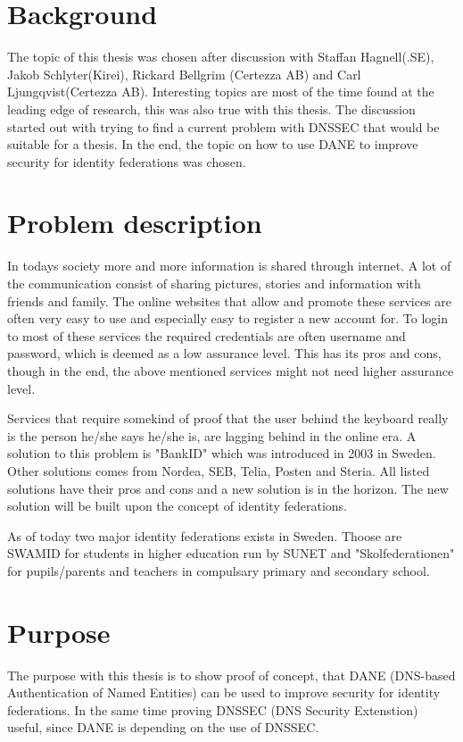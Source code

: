 \section{Background}
The topic of this thesis was chosen after discussion with Staffan Hagnell(.SE), Jakob Schlyter(Kirei), Rickard Bellgrim (Certezza AB) and Carl Ljungqvist(Certezza AB).
Interesting topics are most of the time found at the leading edge of research, this was also true with this thesis.
The discussion started out with trying to find a current problem with DNSSEC \cite{rfc:4033,rfc:4034,rfc:4035,rfc:5011} that would be suitable for a thesis.
In the end, the topic on how to use DANE \cite{rfc:6394,rfc:draft-dane} to improve security for identity federations was chosen.

\section{Problem description}
In todays society more and more information is shared through internet.
A lot of the communication consist of sharing pictures, stories and information with friends and family.
The online websites that allow and promote these services are often very easy to use and especially easy to register a new account for.
To login to most of these services the required credentials are often username and password, which is deemed as a low assurance level\cite[p.~244]{pdf:SOU}.
This has its pros and cons, though in the end, the above mentioned services might not need higher assurance level.

Services that require somekind of proof that the user behind the keyboard really is the person he/she says he/she is, are lagging behind in the online era.
A solution to this problem is "BankID" which was introduced in 2003\cite{website:bankid-about} in Sweden.
Other solutions comes from Nordea, SEB, Telia, Posten and Steria\cite[p.~256]{pdf:SOU}.
All listed solutions have their pros and cons and a new solution is in the horizon.
The new solution will be built upon the concept of identity federations\cite[p.~23]{pdf:SOU}.

As of today two major identity federations exists in Sweden.
Thoose are SWAMID for students in higher education run by SUNET and "Skolfederationen" for pupils/parents and teachers in compulsary primary and secondary school.

\section{Purpose}
The purpose with this thesis is to show proof of concept, that DANE (DNS-based Authentication of Named Entities) can be used to improve security for identity federations.
In the same time proving DNSSEC (DNS Security Extenstion) useful, since DANE is depending on the use of DNSSEC.

